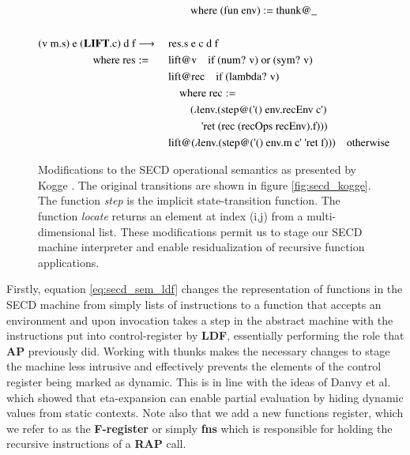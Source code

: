 \documentclass[a4paper,12pt,twoside,openright]{report}
\theoremstyle{definition}
\newcommand{\ts}{\textquotesingle}
\begin{document}
\begin{figure}[htp!]
\begin{alignat}{5}
		& && \qquad\text{where (fun env) $:=$ thunk@\_} \nonumber \\
		\nonumber \\%
		\text{(v m.s) e (} \mathbf{LIFT}\text{.c) d f} & \longrightarrow \: \label{eq:secd_sem_lift}
		 && \text{res.s e c d f}   \\
		 \text{where res} & := && \text{lift@v\quad if (num? v) or (sym? v)} \nonumber \\
		 & && \text{lift@rec} \quad \text{if (lambda? v)} \nonumber \\
		 & && \quad \text{where rec} := \nonumber \\ 
		 & && \qquad\text{($\lambda$env.(step@({\ts}() env.recEnv c{\ts})} \nonumber \\
		 & && \qquad\quad \text{{\ts}ret (rec (recOps recEnv).f)))} \nonumber \\
		 & && \text{lift@($\lambda$env.(step@({\ts}() env.m c{\ts} {\ts}ret f)))} \quad\text{otherwise} \nonumber
\end{alignat}
\caption{Modifications to the SECD operational semantics as presented by Kogge \cite{kogge1990architecture}. The original transitions are shown in figure \ref{fig:secd_kogge}. The function \textit{step} is the implicit state-transition function. The function \textit{locate} returns an element at index (i,j) from a multi-dimensional list. These modifications permit us to stage our SECD machine interpreter and enable residualization of recursive function applications.}
\label{fig:secd_semantics_noset}
\vspace{-7pt} %
\end{figure}
\endgroup
\newpage

Firstly, equation \ref{eq:secd_sem_ldf} changes the representation of functions in the SECD machine from simply lists of instructions to a function that accepts an environment and upon invocation takes a step in the abstract machine with the instructions put into control-register by \textbf{LDF}, essentially performing the role that \textbf{AP} previously did. Working with thunks makes the necessary changes to stage the machine less intrusive and effectively prevents the elements of the control register being marked as dynamic. This is in line with the ideas of Danvy et al. \cite{danvy1995essence} which showed that eta-expansion can enable partial evaluation by hiding dynamic values from static contexts. Note also that we add a new functions register, which we refer to as the \textbf{F-register} or simply \textbf{fns} which is responsible for holding the recursive instructions of a \textbf{RAP} call.
\end{document}
